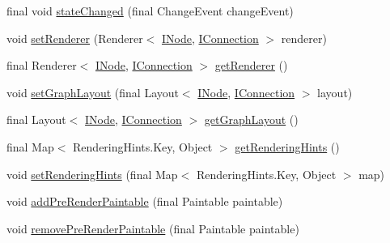 \begin{DoxyCompactItemize}
\item 
final void \hyperlink{classedu_1_1kit_1_1trufflehog_1_1view_1_1_network_graph_view_a7c7c6a1be057408ba4a240eaee96d07e}{state\+Changed} (final Change\+Event change\+Event)
\item 
void \hyperlink{classedu_1_1kit_1_1trufflehog_1_1view_1_1_network_graph_view_aacc21a0362e3788399311fdf2e1513f0}{set\+Renderer} (Renderer$<$ \hyperlink{interfaceedu_1_1kit_1_1trufflehog_1_1model_1_1graph_1_1_i_node}{I\+Node}, \hyperlink{interfaceedu_1_1kit_1_1trufflehog_1_1model_1_1graph_1_1_i_connection}{I\+Connection} $>$ renderer)
\item 
final Renderer$<$ \hyperlink{interfaceedu_1_1kit_1_1trufflehog_1_1model_1_1graph_1_1_i_node}{I\+Node}, \hyperlink{interfaceedu_1_1kit_1_1trufflehog_1_1model_1_1graph_1_1_i_connection}{I\+Connection} $>$ \hyperlink{classedu_1_1kit_1_1trufflehog_1_1view_1_1_network_graph_view_a2ed99b0043d9f235e5f670346a8a7843}{get\+Renderer} ()
\item 
void \hyperlink{classedu_1_1kit_1_1trufflehog_1_1view_1_1_network_graph_view_a16b9f1ccdff6a9178ffe06c28f4a6c0e}{set\+Graph\+Layout} (final Layout$<$ \hyperlink{interfaceedu_1_1kit_1_1trufflehog_1_1model_1_1graph_1_1_i_node}{I\+Node}, \hyperlink{interfaceedu_1_1kit_1_1trufflehog_1_1model_1_1graph_1_1_i_connection}{I\+Connection} $>$ layout)
\item 
final Layout$<$ \hyperlink{interfaceedu_1_1kit_1_1trufflehog_1_1model_1_1graph_1_1_i_node}{I\+Node}, \hyperlink{interfaceedu_1_1kit_1_1trufflehog_1_1model_1_1graph_1_1_i_connection}{I\+Connection} $>$ \hyperlink{classedu_1_1kit_1_1trufflehog_1_1view_1_1_network_graph_view_ac5b235f10b0382e4b30ba166076dc142}{get\+Graph\+Layout} ()
\item 
final Map$<$ Rendering\+Hints.\+Key, Object $>$ \hyperlink{classedu_1_1kit_1_1trufflehog_1_1view_1_1_network_graph_view_ae67e97fdb8f0e5e8707d721c7906961a}{get\+Rendering\+Hints} ()
\item 
void \hyperlink{classedu_1_1kit_1_1trufflehog_1_1view_1_1_network_graph_view_ad1c22bcc1cd71cd27bb83d20de340b6f}{set\+Rendering\+Hints} (final Map$<$ Rendering\+Hints.\+Key, Object $>$ map)
\item 
void \hyperlink{classedu_1_1kit_1_1trufflehog_1_1view_1_1_network_graph_view_a277fd6563f54eb826e046e03d3b6774e}{add\+Pre\+Render\+Paintable} (final Paintable paintable)
\item 
void \hyperlink{classedu_1_1kit_1_1trufflehog_1_1view_1_1_network_graph_view_a799cb57b18f02dfbe5170c1f0fa75450}{remove\+Pre\+Render\+Paintable} (final Paintable paintable)

\end{DoxyCompactItemize}
